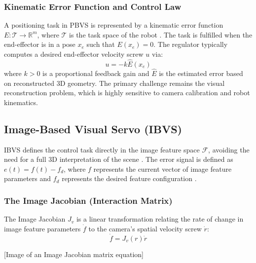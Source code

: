 \documentclass{article}
\begin{document}
\subsubsection{Kinematic Error Function and Control Law}
A positioning task in PBVS is represented by a kinematic error function $E: \mathcal{T} \rightarrow \mathbb{R}^m$, where $\mathcal{T}$ is the task space of the robot \cite{Hutchinson1996}. The task is fulfilled when the end-effector is in a pose $x_e$ such that $E(x_e) = 0$. The regulator typically computes a desired end-effector velocity screw $u$ via:
\begin{equation}
    u = -k \hat{E}(x_e)
\end{equation}
where $k > 0$ is a proportional feedback gain and $\hat{E}$ is the estimated error based on reconstructed 3D geometry. The primary challenge remains the visual reconstruction problem, which is highly sensitive to camera calibration and robot kinematics.

\subsection{Image-Based Visual Servo (IBVS)}
IBVS defines the control task directly in the image feature space $\mathcal{F}$, avoiding the need for a full 3D interpretation of the scene \cite{Hutchinson1996}. The error signal is defined as $e(t) = f(t) - f_d$, where $f$ represents the current vector of image feature parameters and $f_d$ represents the desired feature configuration \cite{Hutchinson1996, Parisa2016}.



\subsubsection{The Image Jacobian (Interaction Matrix)}
The Image Jacobian $J_v$ is a linear transformation relating the rate of change in image feature parameters $\dot{f}$ to the camera's spatial velocity screw $\dot{r}$:
\begin{equation}
    \dot{f} = J_v(r)\dot{r}
\end{equation}



[Image of an Image Jacobian matrix equation]
\end{document}
